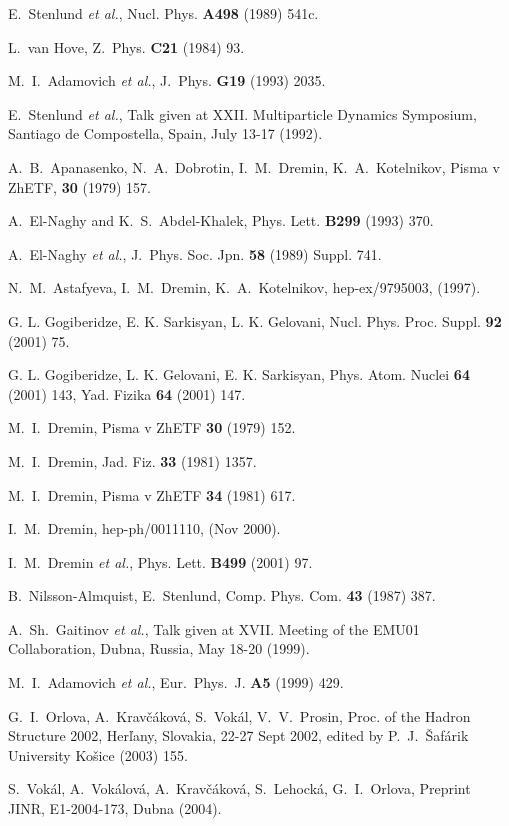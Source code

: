 \documentclass[12pt]{article}
\begin{document}
\begin{thebibliography}{99}

E.~Stenlund {\it et al.}, Nucl. Phys. {\bf A498} (1989) 541c.

L.~van Hove, Z.~Phys. {\bf C21} (1984) 93.

M.~I.~Adamovich {\it et al.}, J.~Phys. {\bf G19} (1993) 2035.

E.~Stenlund {\it et al.}, Talk given at XXII. Multiparticle Dynamics Symposium, Santiago de Compostella, Spain, July 13-17 (1992).

A.~B.~Apanasenko, N.~A.~Dobrotin, I.~M.~Dremin, K.~A.~Kotelnikov, Pisma v ZhETF, {\bf 30}  (1979) 157.

A.~El-Naghy and K.~S.~Abdel-Khalek, Phys. Lett. {\bf B299} (1993) 370.

A.~El-Naghy {\it et al.}, J.~Phys. Soc. Jpn. {\bf 58} (1989) Suppl. 741.

N.~M.~Astafyeva, I.~M.~Dremin, K.~A.~Kotelnikov, hep-ex/9795003, (1997).

G. L. Gogiberidze, E. K. Sarkisyan, L. K. Gelovani, Nucl. Phys. Proc. Suppl. {\bf 92} (2001) 75.

G. L. Gogiberidze, L. K. Gelovani, E. K. Sarkisyan, Phys. Atom. Nuclei {\bf 64} (2001) 143, Yad. Fizika {\bf 64} (2001) 147.

M.~I.~Dremin, Pisma v ZhETF {\bf 30} (1979) 152.

M.~I.~Dremin, Jad. Fiz. {\bf 33} (1981) 1357.

M.~I.~Dremin, Pisma v ZhETF {\bf 34} (1981) 617.

I.~M.~Dremin, hep-ph/0011110, (Nov 2000).

I.~M.~Dremin {\it et al.}, Phys. Lett. {\bf B499} (2001) 97.

B.~Nilsson-Almquist, E.~Stenlund, Comp. Phys. Com. {\bf 43} (1987) 387.

A.~Sh.~Gaitinov {\it et al.}, Talk given at XVII. Meeting of the EMU01 Collaboration, Dubna, Russia, May 18-20 (1999).

M.~I.~Adamovich {\it et al.}, Eur.~Phys.~J. {\bf A5} (1999) 429.

G.~I.~Orlova, A.~Krav\v c\'akov\'a, S.~Vok\'al, V.~V.~Prosin, Proc. of the Hadron Structure 2002, Her\v lany, Slovakia, 22-27 Sept 2002, edited by P.~J.~\v Saf\'arik University Ko\v sice (2003) 155.

S.~Vok\'al, A.~Vok\'alov\'a, A.~Krav\v c\'akov\'a, S.~Lehock\'a, G.~I.~Orlova, Preprint JINR, E1-2004-173, Dubna (2004).

\end{thebibliography}
\end{document}
